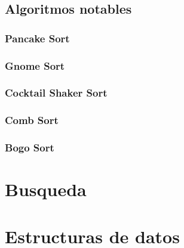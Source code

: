 \documentclass[11pt,openany]{book}
\begin{document}
\section{Algoritmos notables}
\subsection{Pancake Sort}
\subsection{Gnome Sort}
\subsection{Cocktail Shaker Sort}
\subsection{Comb Sort}
\subsection{Bogo Sort}
\printnotes*


\chapter{Busqueda}


\printnotes*

\chapter{Estructuras de datos}


\printnotes*
\end{document}
